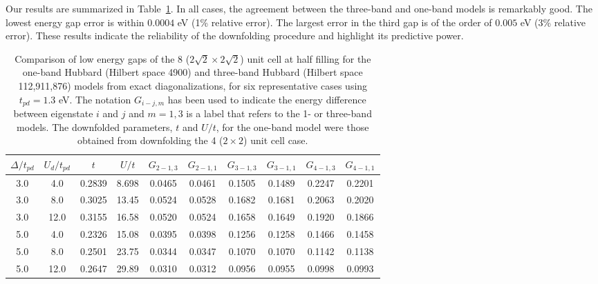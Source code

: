 Our results are summarized in Table~\ref{tab:predictivity}. In all cases, 
the agreement between the three-band and one-band models is remarkably good. The lowest energy gap error 
is within $0.0004$ eV (1\% relative error). 
The largest error in the third gap is of the order of $0.005$ eV (3\% relative error).
These results indicate the reliability of the downfolding procedure 
and highlight its predictive power. 

\begin{table}
\centering
\begin{tabular}{c|c|c|c||c|c||c|c||c|c}
\hline
$\Delta/t_{pd}$ & $U_d/t_{pd}$ & $t$ & $U/t$ & $G_{2-1,3}$ & $G_{2-1,1}$ & $G_{3-1,3}$ & $G_{3-1,1}$ & $G_{4-1,3}$ & $G_{4-1,1}$  \\
\hline
\hline
3.0 & 4.0 &  0.2839 & 8.698 & 0.0465 & 0.0461 & 0.1505 & 0.1489 & 0.2247 & 0.2201  \\ 
3.0 & 8.0 &  0.3025 & 13.45 & 0.0524 & 0.0528 & 0.1682 & 0.1681 & 0.2063 & 0.2020  \\ 
3.0 & 12.0 & 0.3155 & 16.58 & 0.0520 & 0.0524 & 0.1658 & 0.1649 & 0.1920 & 0.1866  \\ 
5.0 & 4.0 &  0.2326 & 15.08 & 0.0395 & 0.0398 & 0.1256 & 0.1258 & 0.1466 & 0.1458  \\ 
5.0 & 8.0 &  0.2501 & 23.75 & 0.0344 & 0.0347 & 0.1070 & 0.1070 & 0.1142 & 0.1138  \\ 
5.0 & 12.0 & 0.2647 & 29.89 & 0.0310 & 0.0312 & 0.0956 & 0.0955 & 0.0998 & 0.0993  \\ 
\hline
\end{tabular}
\caption{Comparison of low energy gaps of the 8 ($2\sqrt{2} \times 2\sqrt{2}$) unit cell 
at half filling for the one-band Hubbard (Hilbert space 4900) and three-band Hubbard (Hilbert space 112,911,876) 
models from exact diagonalizations, for six representative cases using $t_{pd}=1.3 $ eV. The notation $G_{i-j,m}$ 
has been used to indicate the energy difference between eigenstate $i$ and $j$ and $m=1,3$ is a label that 
refers to the 1- or three-band models. 
The downfolded parameters, $t$ and $U/t$, for the one-band model were those obtained from downfolding the 4 ($2\times2$) unit cell 
case. 
 }
\label{tab:predictivity}
\end{table} 

